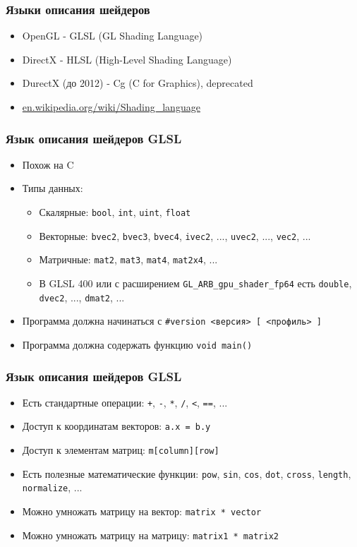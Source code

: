 \documentclass{beamer}
\begin{document}
\begin{frame}[fragile]
\frametitle{Языки описания шейдеров}
\begin{itemize}
\item OpenGL - GLSL (GL Shading Language)
\pause
\item DirectX - HLSL (High-Level Shading Language)
\pause
\item DurectX (до 2012) - Cg (C for Graphics), deprecated
\pause
\item \href{https://en.wikipedia.org/wiki/Shading_language}{en.wikipedia.org/wiki/Shading\_language}
\end{itemize}
\end{frame}

\begin{frame}[fragile]
\frametitle{Язык описания шейдеров GLSL}
\begin{itemize}
\item Похож на C
\pause
\item Типы данных:
\pause
\begin{itemize}
\item Скалярные: \verb|bool|, \verb|int|, \verb|uint|, \verb|float|
\pause
\item Векторные: \verb|bvec2|, \verb|bvec3|, \verb|bvec4|, \verb|ivec2|, ..., \verb|uvec2|, ..., \verb|vec2|, ...
\pause
\item Матричные: \verb|mat2|, \verb|mat3|, \verb|mat4|, \verb|mat2x4|, ...
\pause
\item В GLSL 400 или с расширением \verb|GL_ARB_gpu_shader_fp64| есть \verb|double|, \verb|dvec2|, ..., \verb|dmat2|, ...
\end{itemize}
\pause
\item Программа должна начинаться с \verb|#version <версия> [ <профиль> ]|
\pause
\item Программа должна содержать функцию \verb|void main()|
\end{itemize}
\end{frame}

\begin{frame}[fragile]
\frametitle{Язык описания шейдеров GLSL}
\begin{itemize}
\item Есть стандартные операции: \verb|+|, \verb|-|, \verb|*|, \verb|/|, \verb|<|, \verb|==|, ...
\pause
\item Доступ к координатам векторов: \verb|a.x = b.y|
\pause
\item Доступ к элементам матриц: \verb|m[column][row]|
\pause
\item Есть полезные математические функции: \verb|pow|, \verb|sin|, \verb|cos|, \verb|dot|, \verb|cross|, \verb|length|, \verb|normalize|, ...
\pause
\item Можно умножать матрицу на вектор: \verb|matrix * vector|
\pause
\item Можно умножать матрицу на матрицу: \verb|matrix1 * matrix2|
\end{itemize}
\end{frame}
\end{document}
